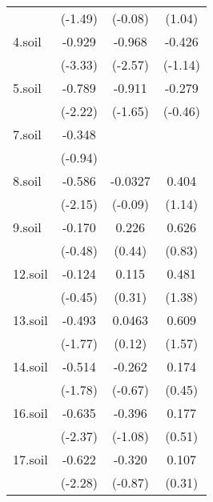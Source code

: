 {\begin{tabular}{l*{3}{c}}
            &     (-1.49)         &     (-0.08)         &      (1.04)         \\
[1em]
4.soil      &      -0.929\sym{***}&      -0.968\sym{**} &      -0.426         \\
            &     (-3.33)         &     (-2.57)         &     (-1.14)         \\
[1em]
5.soil      &      -0.789\sym{**} &      -0.911\sym{*}  &      -0.279         \\
            &     (-2.22)         &     (-1.65)         &     (-0.46)         \\
[1em]
7.soil      &      -0.348         &                     &                     \\
            &     (-0.94)         &                     &                     \\
[1em]
8.soil      &      -0.586\sym{**} &     -0.0327         &       0.404         \\
            &     (-2.15)         &     (-0.09)         &      (1.14)         \\
[1em]
9.soil      &      -0.170         &       0.226         &       0.626         \\
            &     (-0.48)         &      (0.44)         &      (0.83)         \\
[1em]
12.soil     &      -0.124         &       0.115         &       0.481         \\
            &     (-0.45)         &      (0.31)         &      (1.38)         \\
[1em]
13.soil     &      -0.493\sym{*}  &      0.0463         &       0.609         \\
            &     (-1.77)         &      (0.12)         &      (1.57)         \\
[1em]
14.soil     &      -0.514\sym{*}  &      -0.262         &       0.174         \\
            &     (-1.78)         &     (-0.67)         &      (0.45)         \\
[1em]
16.soil     &      -0.635\sym{**} &      -0.396         &       0.177         \\
            &     (-2.37)         &     (-1.08)         &      (0.51)         \\
[1em]
17.soil     &      -0.622\sym{**} &      -0.320         &       0.107         \\
            &     (-2.28)         &     (-0.87)         &      (0.31)         \\

\end{tabular}}
